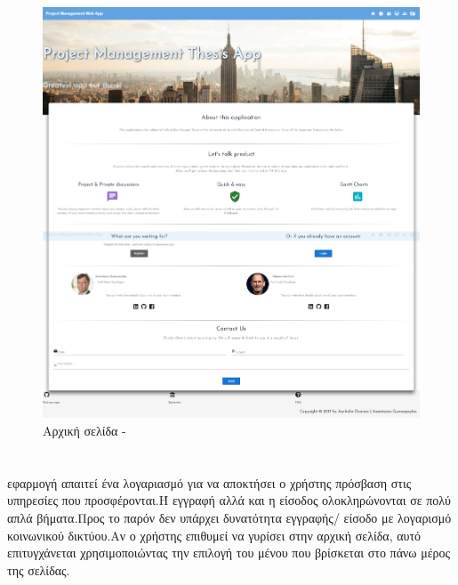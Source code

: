 \begin{figure}[!htb]
\centering
\includegraphics[scale=0.2]{images/homepage.png}
\caption{Αρχική σελίδα - }
\label{fig:homepage}
\end{figure}

\section{}
 εφαρμογή απαιτεί ένα λογαριασμό για να αποκτήσει ο χρήστης πρόσβαση στις υπηρεσίες που προσφέρονται.Ή εγγραφή αλλά και η είσοδος ολοκληρώνονται σε πολύ απλά βήματα.Προς το παρόν δεν υπάρχει δυνατότητα εγγραφής/ είσοδο με λογαρισμό κοινωνικού δικτύου.Αν ο χρήστης επιθυμεί να γυρίσει στην αρχική σελίδα, αυτό επιτυγχάνεται χρησιμοποιώντας την επιλογή του μένου που βρίσκεται στο πάνω μέρος της σελίδας. 

